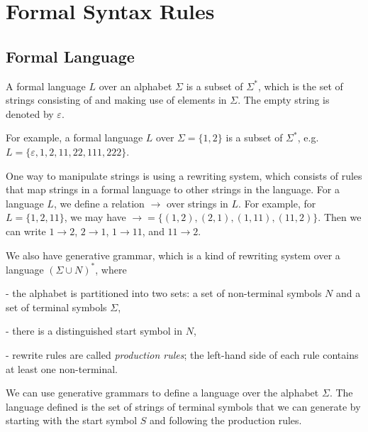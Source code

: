 \section{Formal Syntax Rules}

\subsection{Formal Language}
A formal language \(L\) over an alphabet \(\Sigma\) is a subset of \(\Sigma^*\), which is the set of strings consisting of and making use of elements in \(\Sigma\). The empty string is denoted by \(\varepsilon\). 

For example, a formal language \(L\) over \(\Sigma = \{1, 2\}\) is a subset of \(\Sigma^*\), e.g. \(L = \{\varepsilon, 1, 2, 11, 22, 111, 222\}\). 

One way to manipulate strings is using a rewriting system, which consists of rules that map strings in a formal language to other strings in the language. For a language \(L\), we define a relation \(\to\) over strings in \(L\). For example, for \(L = \{1, 2, 11\}\), we may have \(\to = \{(1, 2), (2, 1), (1, 11), (11, 2)\}\). Then we can write \(1 \to 2\), \(2 \to 1\), \(1 \to 11\), and \(11 \to 2\). 

We also have generative grammar, which is a kind of rewriting system over a language \((\Sigma \cup N)^*\), where

- the alphabet is partitioned into two sets: a set of non-terminal symbols \(N\) and a set of terminal symbols \(\Sigma\),

- there is a distinguished start symbol in \(N\),

- rewrite rules are called \textit{production rules}; the left-hand side of each rule contains at least one non-terminal. 

We can use generative grammars to define a language over the alphabet \(\Sigma\). The language defined is the set of strings of terminal symbols that we can generate by starting with the start symbol \(S\) and following the production rules. 

